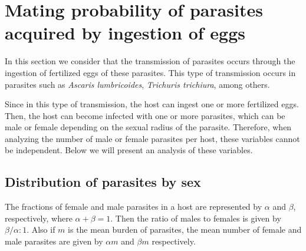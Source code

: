 \documentclass[12pt,a4paper]{article}
\theoremstyle{plain}%
\theoremstyle{definition}
\theoremstyle{remark}
\begin{document}
	\section{Mating probability of parasites acquired by ingestion of eggs}
	\label{sec:probapareamiento}
	
	In this section we consider that the transmission of parasites occurs through the ingestion of fertilized eggs of these parasites.
	This type of transmission occurs in parasites such as \textit{Ascaris lumbricoides}, \textit{Trichuris trichiura}, among others.
	
	Since in this type of transmission, the host can ingest one or more fertilized eggs.
	Then, the host can become infected with one or more parasites, which can be male or female depending on the sexual radius of the parasite.
	Therefore, when analyzing the number of male or female parasites per host, these variables cannot be independent. Below we will present an analysis of these variables.
	
	
%	
	
	
	\subsection{Distribution of parasites by sex} %
	\label{sec:distsexo}%
	The fractions of female and male parasites in a host are represented  by $\alpha$ and $\beta$, respectively, where $\alpha+\beta=1$.
	Then the ratio of males to females is given by $\beta / \alpha : 1$. Also if $m$ is the mean burden of parasites, the mean number of
	female and male parasites are given by $\alpha m$ and $\beta m $ respectively.
	
\end{document}
